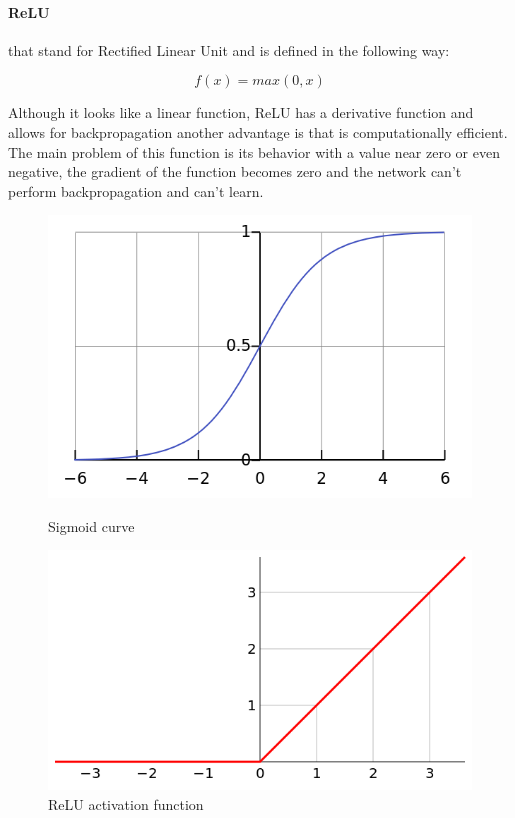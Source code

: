 \documentclass[%
    corpo=12pt,
    twoside,
    oldstyle,
    autoretitolo,
    greek,
    evenboxes,
]{toptesi}
\begin{document}
\paragraph{ReLU} that stand for Rectified Linear Unit and is defined in the following way:
\begin{center}
  \begin{equation}
    f(x)= max(0, x)
  \end{equation}
\end{center}

Although it looks like a linear function, ReLU has a derivative function and allows for backpropagation another advantage is that is computationally efficient. The main problem of this function is its behavior with a value near zero or even negative, the gradient of the function becomes zero and the network can't perform backpropagation and can't learn.

\begin{figure}
  \centering
  \begin{minipage}{.5\textwidth}
    \centering
    \includegraphics[width=0.8\linewidth]{figure/sigmoid.png}
    \caption{Sigmoid curve}
    \label{fig:sigmoid}
  \end{minipage}%
  \begin{minipage}{.5\textwidth}
    \centering
    \includegraphics[width=0.8\linewidth]{figure/relu.png}
    \caption{ReLU activation function}
    \label{fig:relu}
  \end{minipage}
\end{figure}
\end{document}
